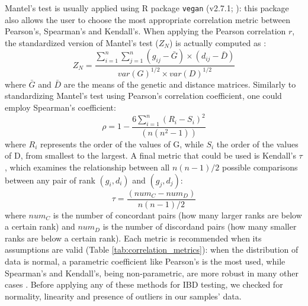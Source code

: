 \documentclass[a4paper, 12pt]{report}
\begin{document}
Mantel's test is usually applied using R package \texttt{vegan} (v2.7.1; \cite{oksanenVeganPackageCommunity2025}): this package also allows the user to choose the most appropriate correlation metric between Pearson's, Spearman's and Kendall's. When applying the Pearson correlation $r$, the standardized version of Mantel's test ($Z_N$) is actually computed as \parencite{diniz-filhoMantelTestPopulation2013}:
\begin{equation}
	Z_N = \dfrac{\sum^n_{i=1} \sum^n_{j=1} (g_{ij} - \bar{G}) \times (d_{ij} - \bar{D}) 
	}
	{var(G)^{1/2} \times var(D)^{1/2}
	}
\end{equation}
where $\bar{G}$ and $\bar{D}$ are the means of the genetic and distance matrices. Similarly to standardizing Mantel's test using Pearson's correlation coefficient, one could employ Spearman's coefficient:
\begin{equation}
	\rho = 1 - \dfrac{6 \sum^n_{i=1}(R_i - S_i)^2}{(n(n^2-1))}
\end{equation}
where $R_i$ represents the order of the values of G, while $S_i$ the order of the values of D, from smallest to the largest. A final metric that could be used is Kendall's $\tau$, which examines the relationship between all $n(n-1)/2$ possible comparisons between any pair of rank $(g_i, d_i)$ and $(g_j, d_j)$:
\begin{equation}
	\tau = \dfrac{(num_C - num_D)}{n(n-1)/2}
\end{equation}
where $num_C$ is the number of concordant pairs (how many larger ranks are below a certain rank) and $num_D$ is the number of discordand pairs (how many smaller ranks are below a certain rank). Each metric is recommended when its assumptions are valid (Table \ref{tab:correlation_metrics}): when the distribution of data is normal, a parametric coefficient like Pearson's is the most used, while Spearman's and Kendall's, being non-parametric, are more robust in many other cases \parencite{el-hashashComparisonPearsonSpearman2022}. Before applying any of these methods for IBD testing, we checked for normality, linearity and presence of outliers in our samples' data.

\begin{table}[h!]
	\centering
	\caption{\textit{\textbf{Comparison between correlation metrics.}}}
	\label{tab:correlation_metrics}
\end{table}
\end{document}
